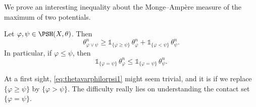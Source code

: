 We prove an interesting inequality about the Monge--Ampère measure of the maximum of two potentials.
\begin{lemma}\label{lma:lorMAineqe}
    Let $\varphi,\psi\in \PSH(X,\theta)$. Then
    \begin{equation}\label{eq:thetavarphilorpsi1}
    \theta_{\varphi\lor \psi}^n\geq \mathds{1}_{\{\varphi\geq \psi\}}\,\theta_{\varphi}^n+\mathds{1}_{\{\varphi<\psi\}}\,\theta_{\psi}^n.
    \end{equation}
    In particular, if $\varphi\leq \psi$, then
    \[
    \mathds{1}_{\{\varphi=\psi\}}\,\theta_{\varphi}^n\leq \mathds{1}_{\{\varphi=\psi\}}\,\theta_{\psi}^n.
    \]
\end{lemma}
At a first sight, \eqref{eq:thetavarphilorpsi1} might seem trivial, and it is if we replace $\{\varphi\geq \psi\}$ by $\{\varphi>\psi\}$. The difficulty really lies on understanding the contact set $\{\varphi=\psi\}$.

